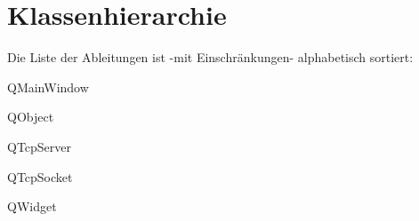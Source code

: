 \section{Klassenhierarchie}
Die Liste der Ableitungen ist -\/mit Einschränkungen-\/ alphabetisch sortiert\+:\begin{DoxyCompactList}
\item {}
\begin{DoxyCompactList}
\item {}
\end{DoxyCompactList}
\item Q\+Main\+Window\begin{DoxyCompactList}
\item {}
\item {}
\end{DoxyCompactList}
\item Q\+Object\begin{DoxyCompactList}
\item {}
\end{DoxyCompactList}
\item Q\+Tcp\+Server\begin{DoxyCompactList}
\item {}
\begin{DoxyCompactList}
\item {}
\end{DoxyCompactList}
\end{DoxyCompactList}
\item Q\+Tcp\+Socket\begin{DoxyCompactList}
\item {}
\begin{DoxyCompactList}
\item {}
\begin{DoxyCompactList}
\item {}
\end{DoxyCompactList}
\end{DoxyCompactList}
\end{DoxyCompactList}
\item Q\+Widget\begin{DoxyCompactList}
\item {}
\item {}
\end{DoxyCompactList}
\end{DoxyCompactList}
